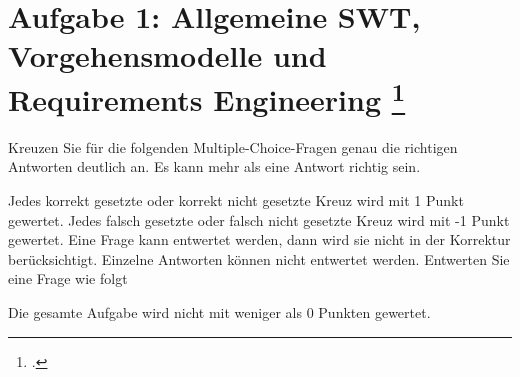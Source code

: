 \documentclass{lehramt-informatik-aufgabe}
\begin{document}
\section{Aufgabe 1: Allgemeine SWT, Vorgehensmodelle und Requirements
Engineering
\footcite[Thema 2 Teilaufgabe 1 Aufgabe 1]{examen:46116:2014:09}}

Kreuzen Sie für die folgenden Multiple-Choice-Fragen genau die richtigen
Antworten deutlich an. Es kann mehr als eine Antwort richtig sein.

Jedes korrekt gesetzte oder korrekt nicht gesetzte Kreuz wird mit 1
Punkt gewertet. Jedes falsch gesetzte oder falsch nicht gesetzte Kreuz
wird mit -1 Punkt gewertet. Eine Frage kann entwertet werden, dann wird
sie nicht in der Korrektur berücksichtigt. Einzelne Antworten können
nicht entwertet werden. Entwerten Sie eine Frage wie folgt

Die gesamte Aufgabe wird nicht mit weniger als 0 Punkten gewertet.
\end{document}
